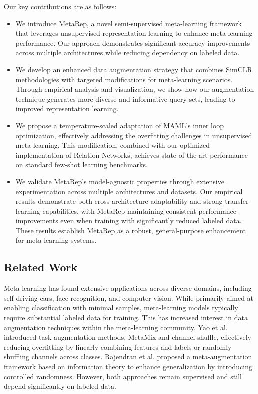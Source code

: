 Our key contributions are as follows:
\begin{itemize}
    \item We introduce MetaRep, a novel semi-supervised meta-learning framework that leverages unsupervised representation learning to enhance meta-learning performance. Our approach demonstrates significant accuracy improvements across multiple architectures while reducing dependency on labeled data.
    
    \item We develop an enhanced data augmentation strategy that combines SimCLR methodologies with targeted modifications for meta-learning scenarios. Through empirical analysis and visualization, we show how our augmentation technique generates more diverse and informative query sets, leading to improved representation learning.
    
    \item We propose a temperature-scaled adaptation of MAML's inner loop optimization, effectively addressing the overfitting challenges in unsupervised meta-learning. This modification, combined with our optimized implementation of Relation Networks, achieves state-of-the-art performance on standard few-shot learning benchmarks.
    
    \item We validate MetaRep's model-agnostic properties through extensive experimentation across multiple architectures and datasets. Our empirical results demonstrate both cross-architecture adaptability and strong transfer learning capabilities, with MetaRep maintaining consistent performance improvements even when training with significantly reduced labeled data. These results establish MetaRep as a robust, general-purpose enhancement for meta-learning systems.
    
\end{itemize}

\subsection{Related Work}

Meta-learning \cite{hospedales2021meta} has found extensive applications across diverse domains, including self-driving cars, face recognition, and computer vision. While primarily aimed at enabling classification with minimal samples, meta-learning models typically require substantial labeled data for training. This has increased interest in data augmentation techniques within the meta-learning community. Yao et al. \cite{yao2021improving} introduced task augmentation methods, MetaMix and channel shuffle, effectively reducing overfitting by linearly combining features and labels or randomly shuffling channels across classes. Rajendran et al. \cite{rajendran2020meta} proposed a meta-augmentation framework based on information theory to enhance generalization by introducing controlled randomness. However, both approaches remain supervised and still depend significantly on labeled data.

